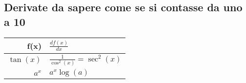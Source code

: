 \subsection{Derivate da sapere come se si contasse da uno a 10}
\begin{center}
\begin{tabular}{r | l}
	f(x) & $\frac{df(x)}{dx}$ \\ [1ex]
	\hline
	$\tan(x)$	& $\frac{1}{\cos^2(x)} = \sec^2(x)$ \\ [0.5ex]
	$a^x$		& $a^x \log(a)$ \\ [0.5ex]
\end{tabular}
\end{center}
